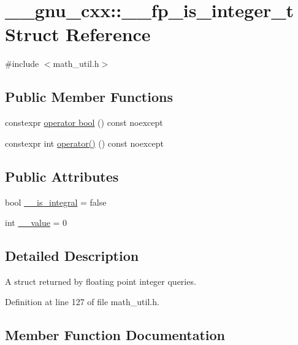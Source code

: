 \hypertarget{struct____gnu__cxx_1_1____fp__is__integer__t}{}\section{\+\_\+\+\_\+gnu\+\_\+cxx\+:\+:\+\_\+\+\_\+fp\+\_\+is\+\_\+integer\+\_\+t Struct Reference}
\label{struct____gnu__cxx_1_1____fp__is__integer__t}


{\ttfamily \#include $<$math\+\_\+util.\+h$>$}

\subsection*{Public Member Functions}
\begin{DoxyCompactItemize}
\item 
constexpr \hyperlink{struct____gnu__cxx_1_1____fp__is__integer__t_a42522819c0045d9a4d8e56e96aac75be}{operator bool} () const noexcept
\item 
constexpr int \hyperlink{struct____gnu__cxx_1_1____fp__is__integer__t_a68b7407b0258fedfe50577a38be63a11}{operator()} () const noexcept
\end{DoxyCompactItemize}
\subsection*{Public Attributes}
\begin{DoxyCompactItemize}
\item 
bool \hyperlink{struct____gnu__cxx_1_1____fp__is__integer__t_a11cf72023d9f2eb1e3982d093de58493}{\+\_\+\+\_\+is\+\_\+integral} = false
\item 
int \hyperlink{struct____gnu__cxx_1_1____fp__is__integer__t_ad30e10c2e2dc2b23d42b4bbbf5592425}{\+\_\+\+\_\+value} = 0
\end{DoxyCompactItemize}


\subsection{Detailed Description}
A struct returned by floating point integer queries. 

Definition at line 127 of file math\+\_\+util.\+h.



\subsection{Member Function Documentation}
\mbox{\label{struct____gnu__cxx_1_1____fp__is__integer__t_a42522819c0045d9a4d8e56e96aac75be}} 
